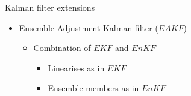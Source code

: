 \documentclass[11pt,compress,aspectratio=1610]{beamer}
\begin{document}
\begin{frame}{Kalman filter extensions}
{\begin{itemize}
\begin{itemize}
        \end{itemize}
    \item Ensemble Adjustment Kalman filter ($EAKF$) 
        \begin{itemize}
            \item Combination of $EKF$ and $EnKF$ 
            \begin{itemize}
                \item Linearises as in $EKF$
                \item Ensemble members as in $EnKF$
            \end{itemize}
        \end{itemize}
\end{itemize}
}
\end{frame}
\end{document}
